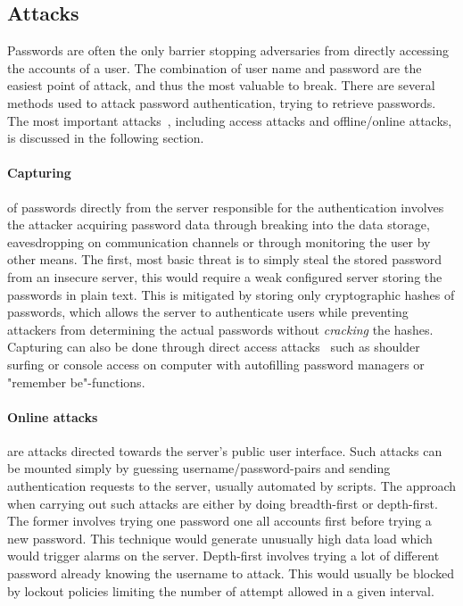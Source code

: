 \subsection{Attacks}\label{atck}
Passwords are often the only barrier stopping adversaries from directly accessing the accounts of a user. The combination of user name and password are the easiest point of attack, and thus the most valuable to break. There are several methods used to attack password authentication, trying to retrieve passwords. The most important attacks~\cite{nist-guide, strong-pws_florencio}, including access attacks and offline/online attacks, is discussed in the following section. 
\paragraph{Capturing} of passwords directly from the server responsible for the authentication involves the attacker acquiring password data through breaking into the data storage, eavesdropping on communication channels or through monitoring the user by other means. The first, most basic threat is to simply steal the stored password from an insecure server, this would require a weak configured server storing the passwords in plain text. This is mitigated by storing only cryptographic hashes of passwords, which allows the server to authenticate users while preventing attackers from determining the actual passwords without \emph{cracking} the hashes. Capturing can also be done through direct access attacks~\cite{guide-pws} such as shoulder surfing or console access on computer with autofilling password managers or "remember be"-functions.

\paragraph{Online attacks} are attacks directed towards the server's public user interface. Such attacks can be mounted simply by guessing username/password-pairs and sending authentication requests to the server, usually automated by scripts. The approach when carrying out such attacks are either by doing breadth-first or depth-first. The former involves trying one password one all accounts first before trying a new password. This technique would generate unusually high data load which would trigger alarms on the server. Depth-first involves trying a lot of different password already knowing the username to attack. This would usually be blocked by lockout policies limiting the number of attempt allowed in a given interval.

